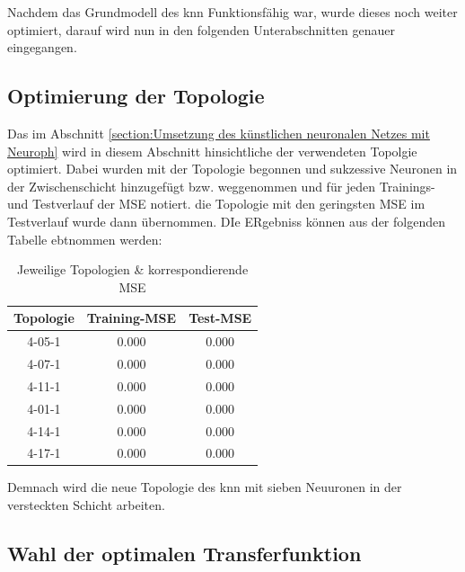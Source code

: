 Nachdem das Grundmodell des \acs{knn} Funktionsfähig war, wurde dieses noch weiter optimiert, darauf wird nun in den folgenden Unterabschnitten genauer eingegangen. 

\label{section:Optimierung des künstlischen neuronalen Netzes}
\subsection{Optimierung der Topologie}
Das im Abschnitt \ref{section:Umsetzung des künstlichen neuronalen Netzes mit Neuroph} wird in diesem Abschnitt hinsichtliche der verwendeten Topolgie optimiert. Dabei wurden mit der Topologie begonnen und sukzessive Neuronen in der Zwischenschicht hinzugefügt bzw. weggenommen und für jeden Trainings- und Testverlauf der MSE notiert. die Topologie mit den geringsten MSE im Testverlauf wurde dann übernommen. DIe ERgebniss können aus der folgenden Tabelle ebtnommen werden:


\begin{table}[H]
  \centering
  \begin{tabular}{|c|c|c|}
  \hline 
  \rule[0ex]{0pt}{2.5ex} Topologie & Training-MSE & Test-MSE \\ 
  \hline 
  \rule[0ex]{0pt}{2.5ex} 4-05-1 & 0.000 & 0.000 \\ 
  \hline 
  \rule[0ex]{0pt}{2.5ex} 4-07-1 & 0.000 & 0.000 \\ 
  \hline 
  \rule[0ex]{0pt}{2.5ex} 4-11-1 & 0.000 & 0.000 \\ 
  \hline 
   \rule[0ex]{0pt}{2.5ex} 4-01-1 & 0.000 & 0.000 \\ 
  \hline 
  \rule[0ex]{0pt}{2.5ex} 4-14-1 & 0.000 & 0.000 \\ 
  \hline 
  \rule[0ex]{0pt}{2.5ex} 4-17-1 & 0.000 & 0.000 \\ 
  \hline 
  \end{tabular} 
  \caption{Jeweilige Topologien \& korrespondierende MSE}
  \label{tab:TOPMSE}
\end{table}


Demnach wird die neue Topologie des \acs{knn} mit sieben Neuuronen in der versteckten Schicht arbeiten.



\subsection{Wahl der optimalen Transferfunktion} 
\label{subsection:Wahl der optimalen Transferfunktion} 



